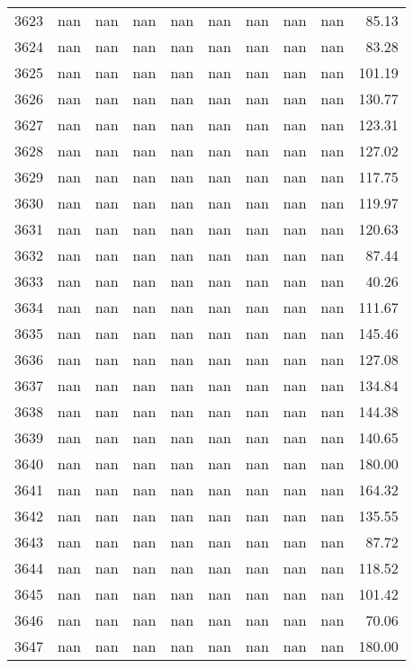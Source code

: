 \begin{tabular}{lrrrrrrrrr}
3623 & nan & nan & nan & nan & nan & nan & nan & nan & 85.13 \\
3624 & nan & nan & nan & nan & nan & nan & nan & nan & 83.28 \\
3625 & nan & nan & nan & nan & nan & nan & nan & nan & 101.19 \\
3626 & nan & nan & nan & nan & nan & nan & nan & nan & 130.77 \\
3627 & nan & nan & nan & nan & nan & nan & nan & nan & 123.31 \\
3628 & nan & nan & nan & nan & nan & nan & nan & nan & 127.02 \\
3629 & nan & nan & nan & nan & nan & nan & nan & nan & 117.75 \\
3630 & nan & nan & nan & nan & nan & nan & nan & nan & 119.97 \\
3631 & nan & nan & nan & nan & nan & nan & nan & nan & 120.63 \\
3632 & nan & nan & nan & nan & nan & nan & nan & nan & 87.44 \\
3633 & nan & nan & nan & nan & nan & nan & nan & nan & 40.26 \\
3634 & nan & nan & nan & nan & nan & nan & nan & nan & 111.67 \\
3635 & nan & nan & nan & nan & nan & nan & nan & nan & 145.46 \\
3636 & nan & nan & nan & nan & nan & nan & nan & nan & 127.08 \\
3637 & nan & nan & nan & nan & nan & nan & nan & nan & 134.84 \\
3638 & nan & nan & nan & nan & nan & nan & nan & nan & 144.38 \\
3639 & nan & nan & nan & nan & nan & nan & nan & nan & 140.65 \\
3640 & nan & nan & nan & nan & nan & nan & nan & nan & 180.00 \\
3641 & nan & nan & nan & nan & nan & nan & nan & nan & 164.32 \\
3642 & nan & nan & nan & nan & nan & nan & nan & nan & 135.55 \\
3643 & nan & nan & nan & nan & nan & nan & nan & nan & 87.72 \\
3644 & nan & nan & nan & nan & nan & nan & nan & nan & 118.52 \\
3645 & nan & nan & nan & nan & nan & nan & nan & nan & 101.42 \\
3646 & nan & nan & nan & nan & nan & nan & nan & nan & 70.06 \\
3647 & nan & nan & nan & nan & nan & nan & nan & nan & 180.00 \\

\end{tabular}
